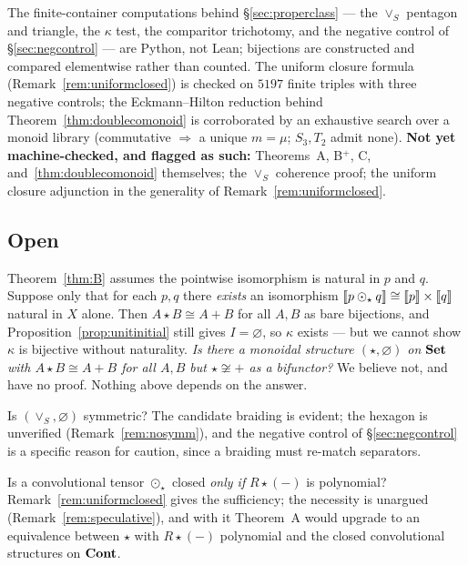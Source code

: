 The finite-container computations behind §\ref{sec:properclass} --- the $\vee_S$
pentagon and triangle, the $\kappa$ test, the comparitor trichotomy, and the
negative control of §\ref{sec:negcontrol} --- are Python, not Lean; bijections are
constructed and compared elementwise rather than counted. The uniform closure
formula (Remark~\ref{rem:uniformclosed}) is checked on $5197$ finite triples with
three negative controls; the Eckmann--Hilton reduction behind
Theorem~\ref{thm:doublecomonoid} is corroborated by an exhaustive search over a
monoid library (commutative $\Rightarrow$ a unique $m=\mu$; $S_3,T_2$ admit
none). \textbf{Not yet machine-checked, and flagged as such:} Theorems~A, B$^+$,
C, and~\ref{thm:doublecomonoid} themselves; the $\vee_S$ coherence proof; the
uniform closure adjunction in the generality of Remark~\ref{rem:uniformclosed}.

\subsection*{Open}

\begin{Question}\label{q:naturality}
Theorem~\ref{thm:B} assumes the pointwise isomorphism is natural in $p$ and $q$.
Suppose only that for each $p,q$ there \emph{exists} an isomorphism
$\llbracket p\mathbin{\odot}_\star q \rrbracket\cong\llbracket p \rrbracket\times\llbracket q \rrbracket$ natural in $X$ alone. Then
$A\star B\cong A+B$ for all $A,B$ as bare bijections, and
Proposition~\ref{prop:unitinitial} still gives $I=\varnothing$, so $\kappa$
exists --- but we cannot show $\kappa$ is bijective without naturality. \emph{Is
there a monoidal structure $(\star,\varnothing)$ on $\mathbf{Set}$ with $A\star B\cong
A+B$ for all $A,B$ but $\star\not\cong+$ as a bifunctor?} We believe not, and
have no proof. Nothing above depends on the answer.
\end{Question}

\begin{Question}\label{q:hexagon}
Is $(\vee_S,\varnothing)$ symmetric? The candidate braiding is evident; the
hexagon is unverified (Remark~\ref{rem:nosymm}), and the negative control of
§\ref{sec:negcontrol} is a specific reason for caution, since a braiding must
re-match separators.
\end{Question}

\begin{Question}\label{q:closedconv}
Is a convolutional tensor $\odot_\star$ closed \emph{only if} $R\star(-)$ is
polynomial? Remark~\ref{rem:uniformclosed} gives the sufficiency; the necessity
is unargued (Remark~\ref{rem:speculative}), and with it Theorem~A would upgrade
to an equivalence between $\star$ with $R\star(-)$ polynomial and the closed
convolutional structures on $\mathbf{Cont}$.
\end{Question}

